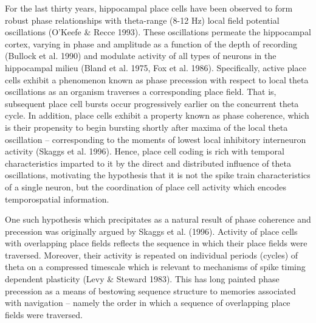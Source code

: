 \documentclass[12pt, letterpaper]{article}
\newenvironment{collapsable}{}{}
\begin{document}
\begin{collapsable}
  For the last thirty years, hippocampal place cells have been observed to form
  robust phase relationships with theta-range (8-12 Hz) local field
  potential oscillations (O'Keefe \& Recce 1993). These oscillations permeate the hippocampal cortex,
  varying in phase and amplitude as a function of the depth of recording
  (Bullock et al. 1990) and modulate activity of all types of neurons in the
  hippocampal milieu (Bland et al. 1975, Fox et al. 1986).
  Specifically, active place cells exhibit a phenomenon known as phase precession with respect to local
  theta oscillations as an organism traverses a corresponding place field. That
  is, subsequent place cell bursts occur progressively earlier on the concurrent
  theta cycle. In addition, place cells exhibit a property known as phase coherence,
  which is their propensity to begin bursting shortly after maxima of the local theta
  oscillation -- corresponding to the moments of lowest local
  inhibitory interneuron activity (Skaggs et al. 1996). Hence, place cell coding is rich
  with temporal characteristics imparted to it by the direct and distributed influence of theta
  oscillations, motivating the hypothesis that it is not the spike train
  characteristics of a single neuron, but the coordination of place cell
  activity which encodes temporospatial information.

  \vspace{12pt}

  One such hypothesis which precipitates as a natural result of phase coherence
  and precession was originally argued by Skaggs et al. (1996). Activity of place cells
  with overlapping place fields reflects the sequence in which their place fields
  were traversed. Moreover, their activity is repeated on individual periods
  (cycles) of theta on a compressed timescale which is relevant to mechanisms of
  spike timing dependent plasticity (Levy \& Steward 1983). This has long painted phase
  precession as a means of bestowing sequence structure to memories associated
  with navigation -- namely the order in which a sequence of overlapping place fields were
  traversed.

  \vspace{12pt}


\end{collapsable}
\end{document}
